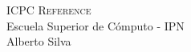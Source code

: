 \documentclass{article}
\begin{document}
\begin{center}
  \Huge\textsc{ICPC Reference}\\
  \vspace{0.30cm}
  \huge Escuela Superior de Cómputo - IPN\\
  \vspace{0.20cm}
  \small Alberto Silva
\end{center}
\hrulefill
\begin{multicols*}{2}
  \tableofcontents	
  \clearpage
  

  \newpage
  
  \newpage
  
  \newpage
  
  \newpage
  
  \newpage
\end{multicols*}
\end{document}
